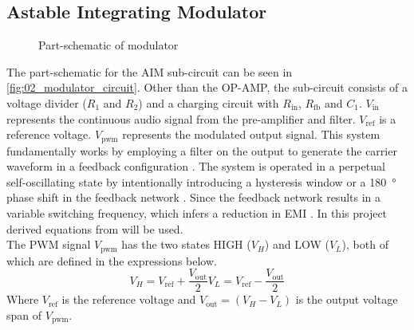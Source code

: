 \subsection{Astable Integrating Modulator}

\begin{figure}[htbp]
	\centering
	\begin{circuitikz}
		
	\end{circuitikz}
	\caption{Part-schematic of modulator}
	\label{fig:02_modulator_circuit}
\end{figure}

The part-schematic for the AIM sub-circuit can be seen in \autoref{fig:02_modulator_circuit}. Other than the OP-AMP, the sub-circuit consists of a voltage divider ($R_{1}$ and $R_{2}$) and a charging circuit with $R_{\mathrm{in}}$, $R_{\mathrm{fb}}$ and $C_{1}$. $V_{\mathrm{in}}$ represents the continuous audio signal from the pre-amplifier and filter. $V_{\mathrm{ref}}$ is a reference voltage. $V_{\mathrm{pwm}}$ represents the modulated output signal. This system fundamentally works by employing a filter on the output to generate the carrier waveform in a feedback configuration \cite{Comp_Simp_selfosc_PWM_mod}. The system is operated in a perpetual self-oscillating state by intentionally introducing a hysteresis window or a \SI{180}{\degree} phase shift in the feedback network \cites{simp_PWM_mod_topo_with_excellent_dynamic_behavior,putzey_simple_self_osc_amp_filter_control}. Since the feedback network results in a variable switching frequency, which infers a reduction in EMI \cite{sw_freq_variations_and_EMI_prop_in_selfosc_classD_amps}.
In this project derived equations from \cites{Comp_Simp_selfosc_PWM_mod,multivar_ctrl_loops_for_SM_audio_systems,soren_simonsen} will be used. \\
The PWM signal $V_{\mathrm{pwm}}$ has the two states HIGH ($V_{H}$) and LOW ($V_{L}$), both of which are defined in the expressions below.
\begin{subequations} \label{eq:pwm_states}
	\begin{equation} \label{eq:pwm_states_a}
		V_{H} = V_{\mathrm{ref}} + \frac{V_{\mathrm{out}}}{2}
	\end{equation}
	\begin{equation} \label{eq:pwm_states_b}
		V_{L} = V_{\mathrm{ref}} - \frac{V_{\mathrm{out}}}{2}
	\end{equation}
\end{subequations}
Where $V_{\mathrm{ref}}$ is the reference voltage and $V_{\mathrm{out}} = \left( V_{H} - V_{L} \right)$ is the output voltage span of $V_{\mathrm{pwm}}$. \\
